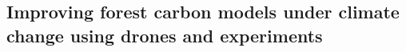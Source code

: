 \documentclass[12pt]{article}
\begin{document}
\pagestyle{fancy}
\fancyhf{} %
\fancyfoot[C]{\thepage}
\renewcommand{\headrulewidth}{0pt}




\subsection*{Improving forest carbon models under climate change using drones and experiments}
\end{document}
